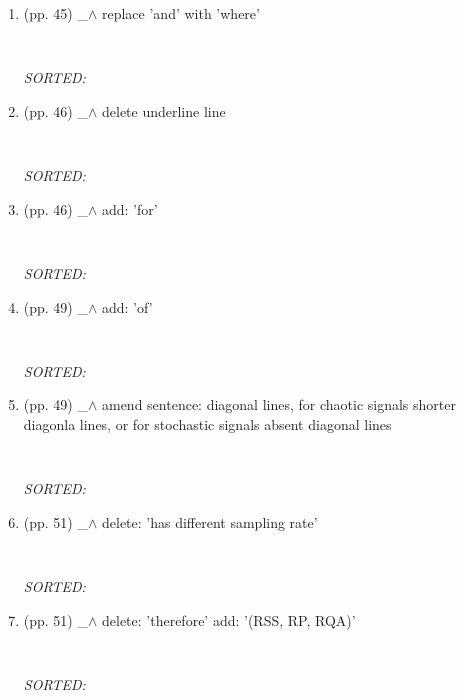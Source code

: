 \documentclass[12pt]{article}
\begin{document}
\begin{enumerate}
\item  (pp. 45)  \_$\wedge$  
	replace 'and' with 'where'
	\begin{verbatim}
	
	\end{verbatim}
	\textit{
	SORTED:  
	}
	\\

\item  (pp. 46)  \_$\wedge$  
	delete underline line
	\begin{verbatim}
	
	\end{verbatim}
	\textit{
	SORTED:  
	}
	\\

\item  (pp. 46)  \_$\wedge$  
	add: 'for'
	\begin{verbatim}
	
	\end{verbatim}
	\textit{
	SORTED:  
	}
	\\

\item  (pp. 49)  \_$\wedge$  
	add: 'of'
	\begin{verbatim}
	
	\end{verbatim}
	\textit{
	SORTED:  
	}
	\\

\item  (pp. 49)  \_$\wedge$  
	amend sentence: 
	diagonal lines, for chaotic signals shorter 
	diagonla lines,
	or for stochastic signals absent diagonal lines
	\begin{verbatim}
	
	\end{verbatim}
	\textit{
	SORTED:  
	}
	\\


\item  (pp. 51)  \_$\wedge$  
	delete: 'has different sampling rate'
	\begin{verbatim}
	
	\end{verbatim}
	\textit{
	SORTED:  
	}
	\\

\item  (pp. 51)  \_$\wedge$ 
	delete: 'therefore' 
	add: '(RSS, RP, RQA)'
	\begin{verbatim}
	
	\end{verbatim}
	\textit{
	SORTED:  
	}
	\\


\end{enumerate}
\end{document}
